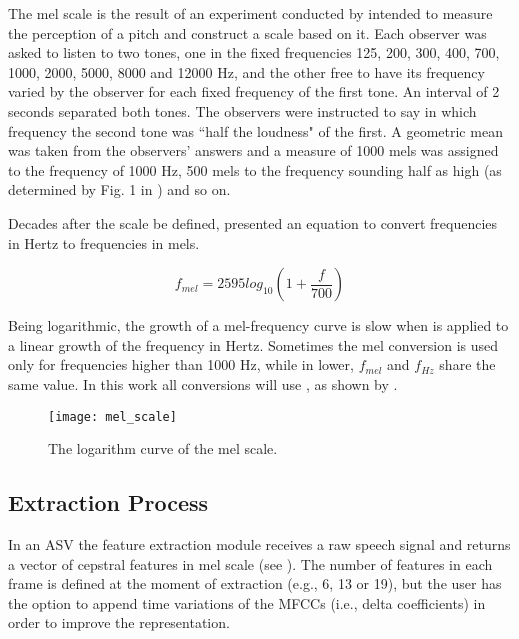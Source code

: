 The mel scale is the result of an experiment conducted by  intended to measure the perception of a pitch and construct a scale based on it. Each observer was asked to listen to two tones, one in the fixed frequencies 125, 200, 300, 400, 700, 1000, 2000, 5000, 8000 and 12000 Hz, and the other free to have its frequency varied by the observer for each fixed frequency of the first tone. An interval of 2 seconds separated both tones. The observers were instructed to say in which frequency the second tone was ``half the loudness" of the first. A geometric mean was taken from the observers' answers and a measure of 1000 mels was assigned to the frequency of 1000 Hz, 500 mels to the frequency sounding half as high (as determined by Fig. 1 in ) and so on.

Decades after the scale be defined,  presented an equation to convert frequencies in Hertz to frequencies in mels.

\begin{equation}
    f_{mel} = 2595 log_{10}(1 + \frac{f}{700})
    \label{eq:mel_conversion}
\end{equation}

\noindent Being logarithmic, the growth of a mel-frequency curve is slow when  is applied to a linear growth of the frequency in Hertz. Sometimes the mel conversion is used only for frequencies higher than 1000 Hz, while in lower, $f_{mel}$ and $f_{Hz}$ share the same value. In this work all conversions will use , as shown by .

\begin{figure}[ht]
    \centering
    \texttt{[image: mel\_scale]}
    \caption{The logarithm curve of the mel scale.}
    \label{fig:mel_scale}
\end{figure}

\subsection{Extraction Process}

In an ASV the feature extraction module receives a raw speech signal and returns a vector of cepstral features in mel scale (see ). The number of features in each frame is defined at the moment of extraction (e.g., 6, 13 or 19), but the user has the option to append time variations of the MFCCs (i.e., delta coefficients) in order to improve the representation.

